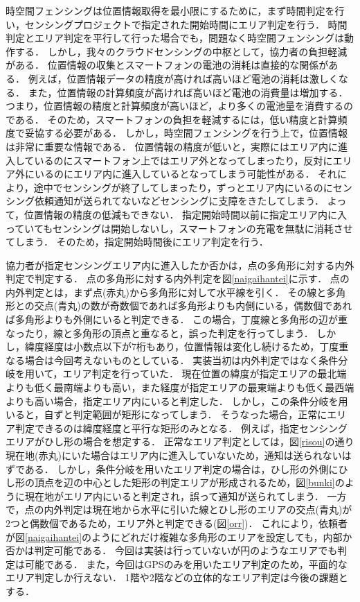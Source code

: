 時空間フェンシングは位置情報取得を最小限にするために，まず時間判定を行い，センシングプロジェクトで指定された開始時間にエリア判定を行う．
時間判定とエリア判定を平行して行った場合でも，問題なく時空間フェンシングは動作する．
しかし，我々のクラウドセンシングの中枢として，協力者の負担軽減がある．
位置情報の収集とスマートフォンの電池の消耗は直接的な関係がある．
例えば，位置情報データの精度が高ければ高いほど電池の消耗は激しくなる．
また，位置情報の計算頻度が高ければ高いほど電池の消費量は増加する．
つまり，位置情報の精度と計算頻度が高いほど，より多くの電池量を消費するのである．
そのため，スマートフォンの負担を軽減するには，低い精度と計算頻度で妥協する必要がある．
しかし，時空間フェンシングを行う上で，位置情報は非常に重要な情報である．
位置情報の精度が低いと，実際にはエリア内に進入しているのにスマートフォン上ではエリア外となってしまったり，反対にエリア外にいるのにエリア内に進入しているとなってしまう可能性がある．
それにより，途中でセンシングが終了してしまったり，ずっとエリア内にいるのにセンシング依頼通知が送られてないなどセンシングに支障をきたしてしまう．
よって，位置情報の精度の低減もできない．
指定開始時間以前に指定エリア内に入っていてもセンシングは開始しないし，スマートフォンの充電を無駄に消耗させてしまう．
そのため，指定開始時間後にエリア判定を行う．

協力者が指定センシングエリア内に進入したか否かは，点の多角形に対する内外判定\cite{naigai}で判定する．
点の多角形に対する内外判定を図\ref{naigaihantei}に示す．
点の内外判定とは，まず点(赤丸)から多角形に対して水平線を引く．
その線と多角形との交点(青丸)の数が奇数個であれば多角形よりも内側にいる，偶数個であれば多角形よりも外側にいると判定できる．
この場合，丁度線と多角形の辺が重なったり，線と多角形の頂点と重なると，誤った判定を行ってしまう．
しかし，緯度経度は小数点以下が7桁もあり，位置情報は変化し続けるため，丁度重なる場合は今回考えないものとしている．
実装当初は内外判定ではなく条件分岐を用いて，エリア判定を行っていた．
現在位置の緯度が指定エリアの最北端よりも低く最南端よりも高い，また経度が指定エリアの最東端よりも低く最西端よりも高い場合，指定エリア内にいると判定した．
しかし，この条件分岐を用いると，自ずと判定範囲が矩形になってしまう．
そうなった場合，正常にエリア判定できるのは緯度経度と平行な矩形のみとなる．
例えば，指定センシングエリアがひし形の場合を想定する．
正常なエリア判定としては，図\ref{risou}の通り現在地(赤丸)にいた場合はエリア内に進入していないため，通知は送られないはずである．
しかし，条件分岐を用いたエリア判定の場合は，ひし形の外側にひし形の頂点を辺の中心とした矩形の判定エリアが形成されるため，図\ref{bunki}のように現在地がエリア内にいると判定され，誤って通知が送られてしまう．
一方で，点の内外判定は現在地から水平に引いた線とひし形のエリアの交点(青丸)が2つと偶数個であるため，エリア外と判定できる(図\ref{orr})．
これにより，依頼者が図\ref{naigaihantei}のようにどれだけ複雑な多角形のエリアを設定しても，内部か否かは判定可能である．
今回は実装は行っていないが円のようなエリアでも判定は可能である．
また，今回はGPSのみを用いたエリア判定のため，平面的なエリア判定しか行えない．
1階や2階などの立体的なエリア判定は今後の課題とする．

